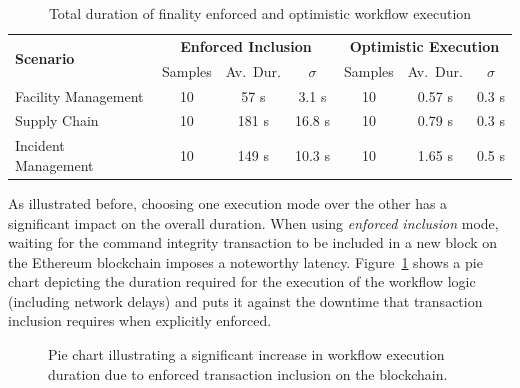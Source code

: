 \begin{table}[h]
\centering
\begin{tabular}{|l|c|c|c|c|c|c|}
    \hline
    \multirow{2}{*}{\bfseries Scenario} &
    \multicolumn{3}{c|}{\bfseries Enforced Inclusion} &
    \multicolumn{3}{c|}{\bfseries Optimistic Execution} \\ \cline{2-7}
    & Samples & Av.\ Dur. & $\sigma$ & Samples & Av.\ Dur. & $\sigma$ \\
    \hline
    Facility Management & 10 & 57 s & 3.1 s & 10 & 0.57 s & 0.3 s  \\
    Supply Chain        & 10 & 181 s & 16.8 s & 10 & 0.79 s & 0.3 s \\
    Incident Management & 10 & 149 s & 10.3 s & 10 & 1.65 s & 0.5 s \\
    \hline
\end{tabular}
\caption{Total duration of finality enforced and optimistic workflow execution}
\label{tab:evaluation:simulations:finality_vs_optimistic_total}
\end{table}

As illustrated before, choosing one execution mode over the other has a significant impact on the overall duration. When using \textit{enforced inclusion} mode, waiting for the command integrity transaction to be included in a new block on the Ethereum blockchain imposes a noteworthy latency. Figure~\ref{fig:evaluation:simulations:pie_chart_transaction_inclusion_portion} shows a pie chart depicting the duration required for the execution of the workflow logic (including network delays) and puts it against the downtime that transaction inclusion requires when explicitly enforced.

\begin{figure}[h]
    \caption{Pie chart illustrating a significant increase in workflow execution duration due to enforced transaction inclusion on the blockchain.}
    \label{fig:evaluation:simulations:pie_chart_transaction_inclusion_portion}
\end{figure}

